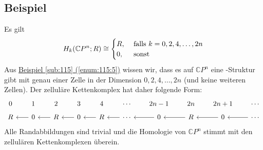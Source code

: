 \subsection[Beispiel: Homologie von $\mathds{C}P^n$]{Beispiel} %
\label{sub:1212}
Es gilt 
\[
	H_k \enbrace*{\mathds{C}P^n;R} \cong  \begin{cases}
		R, &\text{ falls }k=0,2,4,\ldots ,2n\\
		0 ,&\text{ sonst}
	\end{cases}
\]
Aus \hyperref[enum:115:5]{Beispiel \ref*{sub:115} (\ref*{enum:115:5})} wissen wir, dass es auf $\mathds{C}P^n$ eine \CW-Struktur gibt mit genau einer Zelle in der Dimension $0,2,4, \ldots ,2n$ (und keine weiteren 
Zellen). Der zelluläre Kettenkomplex hat daher folgende Form:
\[
	\begin{tikzcd}[row sep=tiny, column sep=scriptsize]
		0 & 1 & 2 & 3 & 4 & \cdots & 2n-1 & 2n & 2n +1 & \cdots \\
		R & 0 \lar & R \lar& 0 \lar & R \lar & \cdots \lar & 0 \lar& R \lar & 0 \lar & \cdots \lar
	\end{tikzcd}
\]
Alle Randabbildungen sind trivial und die Homologie von $\mathds{C}P^n$ stimmt mit den zellulären Kettenkomplexen überein. \bewende {}

